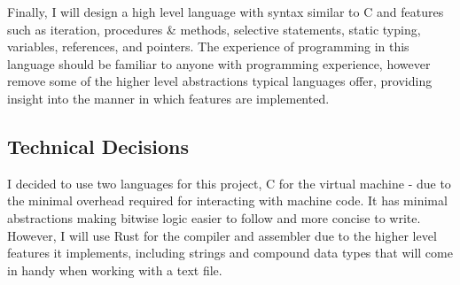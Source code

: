 Finally, I will design a high level language with syntax similar to C and features such as iteration, procedures \& methods, selective statements, static typing, variables, references, and pointers. The experience of programming in this language should be familiar to anyone with programming experience, however remove some of the higher level abstractions typical languages offer, providing insight into the manner in which features are implemented. 



\newpage

\newpage



\newpage


\subsection{Technical Decisions}
I decided to use two languages for this project, C for the virtual machine - due to the minimal overhead required for interacting with machine code. It has minimal abstractions making bitwise logic easier to follow and more concise to write. However, I will use Rust for the compiler and assembler due to the higher level features it implements, including strings and compound data types that will come in handy when working with a text file. 
